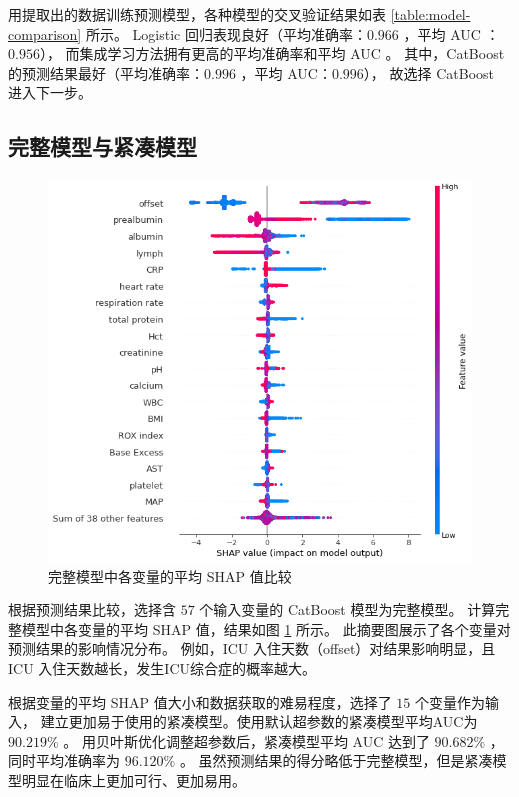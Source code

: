 用提取出的数据训练预测模型，各种模型的交叉验证结果如表 \ref{table:model-comparison} 所示。%
Logistic 回归表现良好（平均准确率：$0.966$ ，平均 AUC ：$0.956$），%
而集成学习方法拥有更高的平均准确率和平均 AUC 。%
其中，CatBoost 的预测结果最好（平均准确率：$0.996$ ，平均 AUC：$0.996$），%
故选择 CatBoost 进入下一步。

\subsection{完整模型与紧凑模型}

\begin{figure}[htb]
    \centering
    \includegraphics[width=0.9\linewidth]{../img/eicu_full_shap_beeswarm_20.png}
    \caption{完整模型中各变量的平均 SHAP 值比较}
    \label{figure:full-shap}
\end{figure}

根据预测结果比较，选择含 $57$ 个输入变量的 CatBoost 模型为完整模型。%
计算完整模型中各变量的平均 SHAP 值，结果如图 \ref{figure:full-shap} 所示。%
此摘要图展示了各个变量对预测结果的影响情况分布。%
例如，ICU 入住天数（offset）对结果影响明显，且 ICU 入住天数越长，发生ICU综合症的概率越大。

根据变量的平均 SHAP 值大小和数据获取的难易程度，选择了 $15$ 个变量作为输入，%
建立更加易于使用的紧凑模型。使用默认超参数的紧凑模型平均AUC为 $90.219\%$ 。%
用贝叶斯优化调整超参数后，紧凑模型平均 AUC 达到了 $90.682\%$ ，同时平均准确率为 $96.120\%$ 。%
虽然预测结果的得分略低于完整模型，但是紧凑模型明显在临床上更加可行、更加易用。

